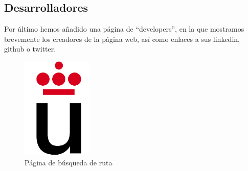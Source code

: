 \documentclass[11pt,a4paper]{article}
\begin{document}
\subsection{Desarrolladores}
Por último hemos añadido una página de ``developers'', en la que mostramos brevemente los creadores de la página web, así como enlaces a sus linkedin, github o twitter.
\begin{figure}[h]
\centering
  \includegraphics[width=0.3\textwidth]{./imagenes/logoURJC}
  \caption{Página de búsqueda de ruta}
  \label{fig: Página de búsqueda de developers}
\end{figure}

\clearpage
\end{document}
